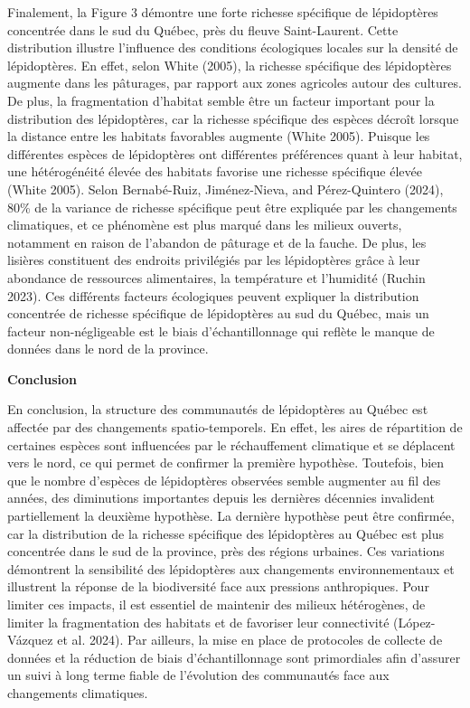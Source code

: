 \documentclass[9pt,twocolumn,twoside,]{pnas-new}
\begin{document}
Finalement, la Figure 3 démontre une forte richesse spécifique de
lépidoptères concentrée dans le sud du Québec, près du fleuve
Saint-Laurent. Cette distribution illustre l'influence des conditions
écologiques locales sur la densité de lépidoptères. En effet, selon
White (2005), la richesse spécifique des lépidoptères augmente dans les
pâturages, par rapport aux zones agricoles autour des cultures. De plus,
la fragmentation d'habitat semble être un facteur important pour la
distribution des lépidoptères, car la richesse spécifique des espèces
décroît lorsque la distance entre les habitats favorables augmente
(White 2005). Puisque les différentes espèces de lépidoptères ont
différentes préférences quant à leur habitat, une hétérogénéité élevée
des habitats favorise une richesse spécifique élevée (White 2005). Selon
Bernabé-Ruiz, Jiménez-Nieva, and Pérez-Quintero (2024), 80\% de la
variance de richesse spécifique peut être expliquée par les changements
climatiques, et ce phénomène est plus marqué dans les milieux ouverts,
notamment en raison de l'abandon de pâturage et de la fauche. De plus,
les lisières constituent des endroits privilégiés par les lépidoptères
grâce à leur abondance de ressources alimentaires, la température et
l'humidité (Ruchin 2023). Ces différents facteurs écologiques peuvent
expliquer la distribution concentrée de richesse spécifique de
lépidoptères au sud du Québec, mais un facteur non-négligeable est le
biais d'échantillonnage qui reflète le manque de données dans le nord de
la province.

\vspace{10pt}

\textbf{Conclusion}

En conclusion, la structure des communautés de lépidoptères au Québec
est affectée par des changements spatio-temporels. En effet, les aires
de répartition de certaines espèces sont influencées par le
réchauffement climatique et se déplacent vers le nord, ce qui permet de
confirmer la première hypothèse. Toutefois, bien que le nombre d'espèces
de lépidoptères observées semble augmenter au fil des années, des
diminutions importantes depuis les dernières décennies invalident
partiellement la deuxième hypothèse. La dernière hypothèse peut être
confirmée, car la distribution de la richesse spécifique des
lépidoptères au Québec est plus concentrée dans le sud de la province,
près des régions urbaines. Ces variations démontrent la sensibilité des
lépidoptères aux changements environnementaux et illustrent la réponse
de la biodiversité face aux pressions anthropiques. Pour limiter ces
impacts, il est essentiel de maintenir des milieux hétérogènes, de
limiter la fragmentation des habitats et de favoriser leur connectivité
(López-Vázquez et al. 2024). Par ailleurs, la mise en place de
protocoles de collecte de données et la réduction de biais
d'échantillonnage sont primordiales afin d'assurer un suivi à long terme
fiable de l'évolution des communautés face aux changements climatiques.
\end{document}
